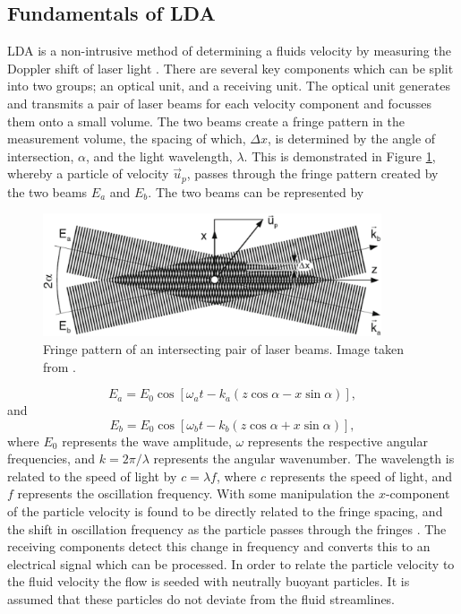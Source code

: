 \documentclass[12pt,oneside,a4paper]{article}
\begin{document}
\subsection{Fundamentals of LDA}
LDA is a non-intrusive method of determining a fluids velocity by measuring the Doppler shift of laser light \citep{zhang2010lda}. There are several key components which can be split into two groups; an optical unit, and a receiving unit. The optical unit generates and transmits a pair of laser beams for each velocity component and focusses them onto a small volume. %
 The two beams create a fringe pattern in the measurement volume, the spacing of which, $\Delta x$, is determined by the angle of intersection, $\alpha$, and the light wavelength, $\lambda$. This is demonstrated in Figure \ref{figure:experiments:fringePattern}, whereby a particle of velocity $\overrightarrow{u}_p$, passes through the fringe pattern created by the two beams $E_a$ and $E_b$. The two beams can be represented by 
%
\begin{figure}[!b]
\centering
\includegraphics[width=10cm]{images/LDA_theoryImages/fringePattern.png}
\caption{Fringe pattern of an intersecting pair of laser beams. Image taken from \cite{zhang2010lda}.}
\label{figure:experiments:fringePattern}
\end{figure}
%
\begin{equation}
E_a = E_0 \cos {\left[ \omega_a t - k_a (z \cos{\alpha} - x \sin{\alpha} ) \right]},
\end{equation}
and
\begin{equation}
E_b = E_0 \cos{ \left[ \omega_b t - k_b (z \cos{\alpha} + x \sin{\alpha} ) \right]},
\end{equation}
where $E_0$ represents the wave amplitude, $\omega$ represents the respective angular frequencies, and $k = 2 \pi / \lambda$ represents the angular wavenumber. The wavelength is related to the speed of light by $c = \lambda f$, where $c$ represents the speed of light, and $f$ represents the oscillation frequency. With some manipulation the $x$-component of the particle velocity is found to be directly related to the fringe spacing, and the shift in oscillation frequency as the particle passes through the fringes \citep{zhang2010lda}. The receiving components detect this change in frequency and converts this to an electrical signal which can be processed. In order to relate the particle velocity to the fluid velocity the flow is seeded with neutrally buoyant particles. It is assumed that these particles do not deviate from the fluid streamlines. 
\end{document}
